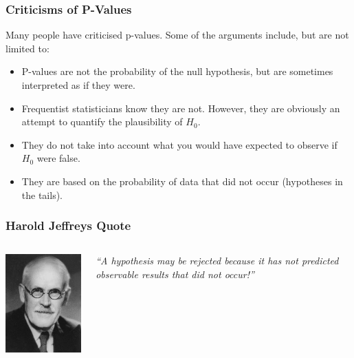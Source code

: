 \documentclass{beamer}
\begin{document}
\begin{frame}
\frametitle{Criticisms of P-Values}
Many people have criticised p-values. Some of the arguments include, but are not
limited to:
\begin{itemize}
\item P-values are not the probability of the null hypothesis, but are sometimes
interpreted as if they were.\pause
\item Frequentist statisticians know they are not. However, they are obviously
an attempt to quantify the plausibility of $H_0$.\pause
\item They do not take into account what you would have expected to observe if
$H_0$ were false.\pause
\item They are based on the probability of data that did not occur
(hypotheses in the tails).
\end{itemize}

\end{frame}

\begin{frame}
\frametitle{Harold Jeffreys Quote}

    \begin{columns} %
        \includegraphics[width=0.7\linewidth]{images/jeffreys.jpg}

        {\em ``A hypothesis may be rejected because it has not predicted
               observable results that did not occur!''}
     \end{columns}

\end{frame}
\end{document}

